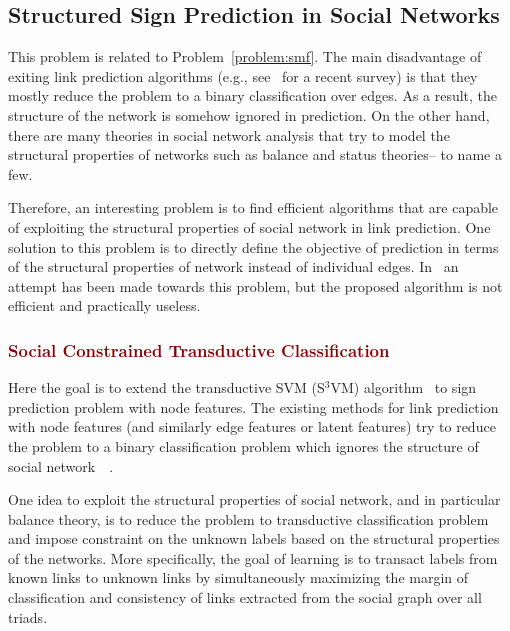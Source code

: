 \documentclass[11pt]{article}
\theoremstyle{definition}
\begin{document}
\subsection{Structured Sign Prediction in Social Networks}

This problem is related to Problem~\ref{problem:smf}. The main disadvantage of exiting link prediction algorithms (e.g., see~\cite{menon2011link} for a recent survey) is that they mostly reduce the problem to a binary classification over  edges. As a result, the structure of the network is somehow ignored in prediction. On the other hand, there are many theories in social network analysis that try to model the structural properties of networks such as balance  and status theories-- to name a few. 

Therefore, an interesting problem is  to find efficient algorithms that are capable of exploiting the structural properties of social network in link prediction. One solution to this problem is to directly define the objective of prediction in terms of the structural properties of network instead of individual edges.  In~\cite{chiang2014prediction} an attempt has been made towards this problem, but the proposed algorithm is not efficient and practically useless. 

\subsubsection{\textcolor{DarkRed}{Social Constrained Transductive Classification}}

Here the goal is to extend the transductive SVM (S$^3$VM) algorithm~\cite{bennett1999semi,joachims1998text} to sign prediction problem with node features. The existing methods for link prediction with node features (and similarly edge features or latent features) try to reduce the problem to a binary classification problem which ignores the structure of social network~~\cite{menon2011link}.  

One idea to exploit the structural properties of social network, and in particular balance theory, is to reduce the problem to transductive classification problem and impose constraint on the unknown labels based on the structural properties of the networks.  More specifically, the goal of learning is to transact labels  from known links  to  unknown links by simultaneously  maximizing the margin of classification and consistency of links extracted from the social graph over all triads. 
\end{document}
